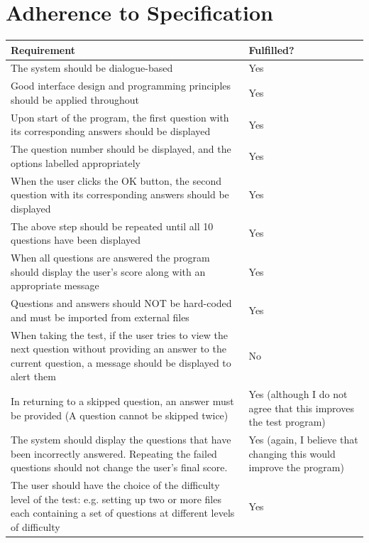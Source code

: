\documentclass{report}
\begin{document}
        \section{Adherence to Specification}
        \begin{longtable}[c]{|p{}|p{}|}
        	\hline
        	\textbf{Requirement} & \textbf{Fulfilled?} \\ \hline
        	The system should be dialogue-based & Yes \\ \hline
        	Good interface design and programming principles should be applied throughout & Yes \\ \hline
        	Upon start of the program, the first question with its corresponding answers should be displayed & Yes \\ \hline
        	The question number should be displayed, and the options labelled appropriately & Yes \\ \hline
        	When the user clicks the OK button, the second question with its corresponding answers should be displayed & Yes \\ \hline
        	The above step should be repeated until all 10 questions have been displayed & Yes \\ \hline
        	When all questions are answered the program should display the user's score along with an appropriate message & Yes \\ \hline
        	Questions and answers should NOT be hard-coded and must be imported from external files & Yes \\ \hline
        	When taking the test, if the user tries to view the next question without providing an answer to the current question, a message should be displayed to alert them & No \\ \hline
        	In returning to a skipped question, an answer must be provided (A question cannot be skipped twice) & Yes (although I do not agree that this improves the test program) \\ \hline
        	The system should display the questions that have been incorrectly answered. Repeating the failed questions should not change the user's final score. & Yes (again, I believe that changing this would improve the program) \\ \hline
        	The user should have the choice of the difficulty level of the test: e.g. setting up two or more files each containing a set of questions at different levels of difficulty & Yes \\ \hline
        \end{longtable}
    
\end{document}
